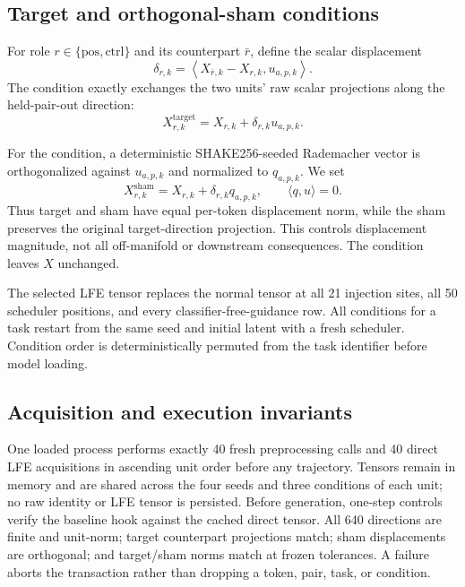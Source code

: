 \documentclass[10pt,twocolumn,letterpaper]{article}
\begin{document}
\subsection{Target and orthogonal-sham conditions}

For role $r\in\{\mathrm{pos},\mathrm{ctrl}\}$ and its counterpart $\bar r$, define the scalar displacement
\begin{equation}
 \delta_{r,k}=\left\langle X_{\bar r,k}-X_{r,k},u_{a,p,k}\right\rangle.
\end{equation}
The \target condition exactly exchanges the two units' raw scalar projections along the held-pair-out direction:
\begin{equation}
 X^{\mathrm{target}}_{r,k}=X_{r,k}+\delta_{r,k}u_{a,p,k}.
\end{equation}

For the \sham condition, a deterministic SHAKE256-seeded Rademacher vector is orthogonalized against $u_{a,p,k}$ and normalized to $q_{a,p,k}$.  We set
\begin{equation}
 X^{\mathrm{sham}}_{r,k}=X_{r,k}+\delta_{r,k}q_{a,p,k},\qquad
 \langle q,u\rangle=0.
\end{equation}
Thus target and sham have equal per-token displacement norm, while the sham preserves the original target-direction projection.  This controls displacement magnitude, not all off-manifold or downstream consequences.  The \baseline condition leaves $X$ unchanged.

The selected LFE tensor replaces the normal tensor at all 21 injection sites, all 50 scheduler positions, and every classifier-free-guidance row.  All conditions for a task restart from the same seed and initial latent with a fresh scheduler.  Condition order is deterministically permuted from the task identifier before model loading.

\subsection{Acquisition and execution invariants}

One loaded process performs exactly 40 fresh preprocessing calls and 40 direct LFE acquisitions in ascending unit order before any trajectory.  Tensors remain in memory and are shared across the four seeds and three conditions of each unit; no raw identity or LFE tensor is persisted.  Before generation, one-step controls verify the baseline hook against the cached direct tensor.  All 640 directions are finite and unit-norm; target counterpart projections match; sham displacements are orthogonal; and target/sham norms match at frozen tolerances.  A failure aborts the transaction rather than dropping a token, pair, task, or condition.
\end{document}
